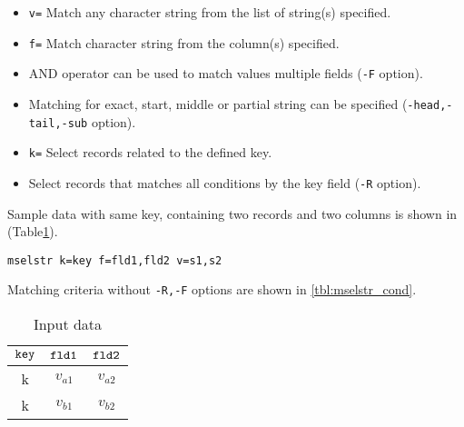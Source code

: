 \begin{itemize}
\item \verb|v=| Match any character string from the list of string(s) specified. 
\item \verb|f=| Match character string from the column(s) specified. 
\item AND operator can be used to match values multiple fields (\verb|-F| option).
\item Matching for exact, start, middle or partial string can be specified (\verb|-head,-tail,-sub| option). 
\item \verb|k=| Select records related to the defined key. 
\item Select records that matches all conditions by the key field (\verb|-R| option). 
\end{itemize}

Sample data with same key, containing two records and two columns is shown in (Table\ref{tbl:mselstr_input2}).
\begin{Verbatim}[baselinestretch=0.7,frame=single,fontsize=\small]
mselstr k=key f=fld1,fld2 v=s1,s2
\end{Verbatim}
Matching criteria without \verb|-R,-F| options are shown in \ref{tbl:mselstr_cond}. 

\begin{table}[htbp]
\begin{center}

\caption{Input data\label{tbl:mselstr_input2}}
{\small
\begin{tabular}{ccc}
\hline
$\verb|key|$ & $\verb|fld1|$ & $\verb|fld2|$ \\
\hline
k & $v_{a1}$ & $v_{a2}$ \\
k & $v_{b1}$ & $v_{b2}$ \\
\hline

\end{tabular}
}
\end{center}
\end{table}

